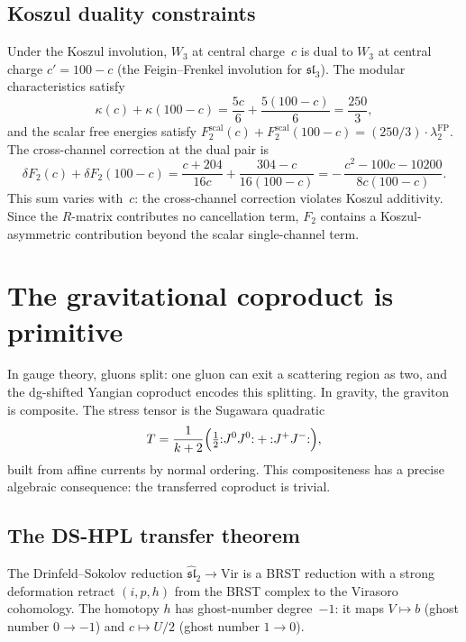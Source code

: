 \documentclass[11pt]{article}
\theoremstyle{plain}
\theoremstyle{definition}
\theoremstyle{remark}
\begin{document}
\subsection{Koszul duality constraints}
\label{subsec:w3-koszul-duality}

Under the Koszul involution, $W_3$ at central charge~$c$ is
dual to $W_3$ at central charge $c' = 100 - c$
(the Feigin--Frenkel involution for $\mathfrak{sl}_3$). The modular
characteristics satisfy
\begin{equation}
\kappa(c) + \kappa(100-c) = \frac{5c}{6} + \frac{5(100-c)}{6}
= \frac{250}{3},
\end{equation}
and the scalar free energies satisfy $F_2^{\mathrm{scal}}(c) +
F_2^{\mathrm{scal}}(100-c) = (250/3) \cdot \lambda_2^{\mathrm{FP}}$.
The cross-channel correction at the dual pair is
\[
\delta F_2(c) + \delta F_2(100-c)
= \frac{c+204}{16c} + \frac{304-c}{16(100-c)}
= -\,\frac{c^2 - 100c - 10200}{8c(100-c)}.
\]
This sum varies with~$c$: the cross-channel correction violates
Koszul additivity. Since the $R$-matrix contributes no
cancellation term, $F_2$ contains a Koszul-asymmetric contribution
beyond the scalar single-channel term.


\section{The gravitational coproduct is primitive}
\label{sec:gravitational-coproduct}

In gauge theory, gluons split: one gluon can exit a scattering
region as two, and the dg-shifted Yangian coproduct encodes this
splitting. In gravity, the graviton is composite.
The stress tensor is the Sugawara quadratic
\begin{equation}\label{eq:sugawara}
T = \frac{1}{k+2}\Bigl(\tfrac{1}{2} {:}J^0 J^0{:}
+ {:}J^+ J^-{:}\Bigr),
\end{equation}
built from affine currents by normal ordering.
This compositeness has a precise algebraic consequence: the
transferred coproduct is trivial.


\subsection{The DS-HPL transfer theorem}
\label{subsec:ds-hpl}

The Drinfeld--Sokolov reduction $\hat{\mathfrak{sl}}_2 \to
\mathrm{Vir}$ is a BRST reduction with a strong deformation retract
$(i, p, h)$ from the BRST complex to the Virasoro cohomology.
The homotopy $h$ has ghost-number degree~$-1$: it maps
$V \mapsto b$ (ghost number $0 \to -1$) and
$c \mapsto U/2$ (ghost number $1 \to 0$).
\end{document}
